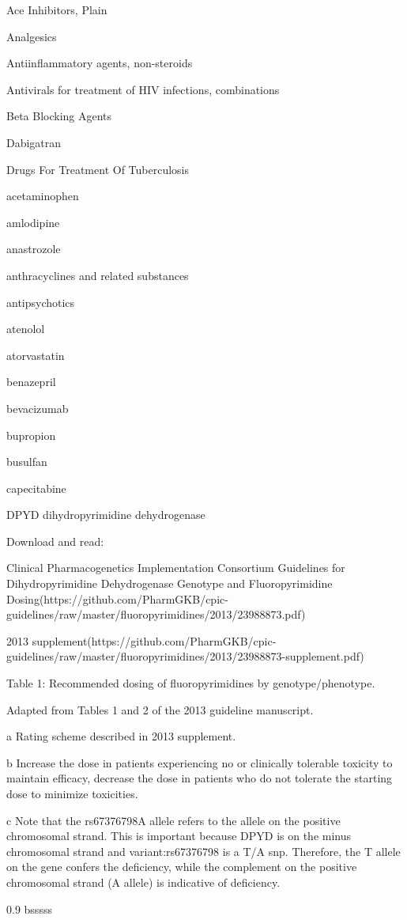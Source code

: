 \documentclass{resume} %
\begin{document}
\begin{rSection}{ Ace Inhibitors, Plain }
\begin{rSection}{ Analgesics }
\begin{rSection}{ Antiinflammatory agents, non-steroids }
\begin{rSection}{ Antivirals for treatment of HIV infections, combinations }
\begin{rSection}{ Beta Blocking Agents }
\begin{rSection}{ Dabigatran }
\begin{rSection}{ Drugs For Treatment Of Tuberculosis }
\begin{rSection}{ acetaminophen }
\begin{rSection}{ amlodipine }
\begin{rSection}{ anastrozole }
\begin{rSection}{ anthracyclines and related substances }
\begin{rSection}{ antipsychotics }
\begin{rSection}{ atenolol }
\begin{rSection}{ atorvastatin }
\begin{rSection}{ benazepril }
\begin{rSection}{ bevacizumab }
\begin{rSection}{ bupropion }
\begin{rSection}{ busulfan }
\begin{rSection}{ capecitabine }
\begin{rSubsection}{ DPYD }{ dihydropyrimidine dehydrogenase }{}{}
 \newline
\item Download and read:
 \newline
\item Clinical Pharmacogenetics Implementation Consortium Guidelines for Dihydropyrimidine Dehydrogenase Genotype and Fluoropyrimidine Dosing(https://github.com/PharmGKB/cpic-guidelines/raw/master/fluoropyrimidines/2013/23988873.pdf)
 \newline
\item 2013 supplement(https://github.com/PharmGKB/cpic-guidelines/raw/master/fluoropyrimidines/2013/23988873-supplement.pdf)
 \newline
\item Table 1: Recommended dosing of fluoropyrimidines by genotype/phenotype.
 \newline
\item Adapted from Tables 1 and 2 of the 2013 guideline manuscript.
 \newline
\item a Rating scheme described in 2013 supplement.
 \newline
\item b Increase the dose in patients experiencing no or clinically tolerable toxicity to maintain efficacy,  decrease the dose in patients who do not tolerate the starting dose to minimize toxicities.
 \newline
\item c Note that the rs67376798A allele refers to the allele on the positive chromosomal strand.  This is important because DPYD is on the minus chromosomal strand and variant:rs67376798 is a T/A snp.  Therefore, the T allele on the gene confers the deficiency, while the complement on the positive chromosomal strand (A allele) is indicative of deficiency. \newline
\vspace{1pt}\newline
		\scriptsize
		\begin{center}
		\begin{tabularx}{0.9\textwidth}{ bsssss }

\end{tabularx}
\end{center}
\end{rSubsection}
\end{rSection}
\end{rSection}
\end{rSection}
\end{rSection}
\end{rSection}
\end{rSection}
\end{rSection}
\end{rSection}
\end{rSection}
\end{rSection}
\end{rSection}
\end{rSection}
\end{rSection}
\end{rSection}
\end{rSection}
\end{rSection}
\end{rSection}
\end{rSection}
\end{rSection}
\end{document}
